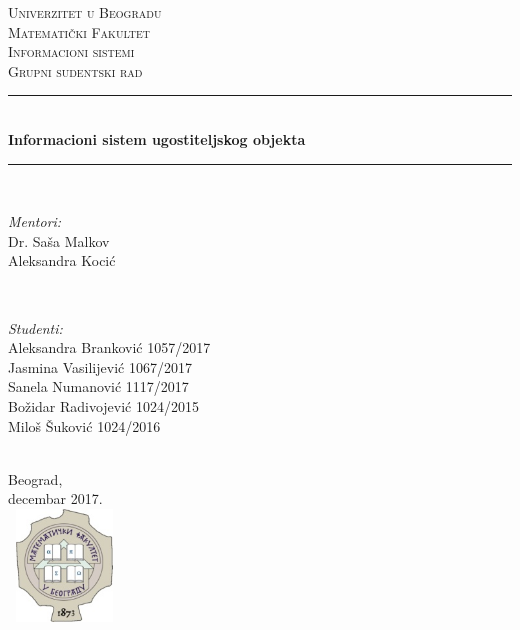 \documentclass{article}
\begin{document}
\begin{titlepage}
\newcommand{\HRule}{\rule{\linewidth}{0.5mm}} 
\center 

\textsc{\LARGE Univerzitet u Beogradu\\ Matematički Fakultet }\\[1.5cm] 
\textsc{\Large Informacioni sistemi}\\[0.5cm] 
\textsc{\large Grupni sudentski rad}\\[0.5cm] 

\HRule \\[0.4cm]
{ \huge \bfseries Informacioni sistem ugostiteljskog objekta}\\[0.4cm] 
\HRule \\[1.5cm]

\begin{minipage}{0.4\textwidth}
\begin{flushleft} \large
\emph{Mentori:}\\
Dr. Saša Malkov\\
Aleksandra Kocić
\end{flushleft}
\end{minipage}
~
\begin{minipage}{0.5\textwidth}
\begin{flushright} \large
\emph{Studenti:} \\
Aleksandra Branković 1057/2017\\
Jasmina Vasilijević 1067/2017\\
Sanela Numanović 1117/2017\\
Božidar Radivojević 1024/2015\\
Miloš Šuković 1024/2016\\
\end{flushright}
\end{minipage}\\[2cm]


 
{\large Beograd,\\ decembar 2017.}\\[2cm] 
\includegraphics[width=3cm,height=3cm, keepaspectratio]{matf.jpg}\\[1cm]
 

\vfill 

\end{titlepage}
\end{document}
